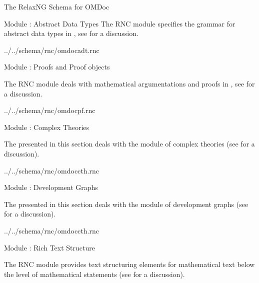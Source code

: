 \begin{tchapter}[id=rnc]{The RelaxNG Schema for OMDoc}
\begin{tsection}[id=rnc:adt]{Module {}: Abstract Data Types}
The RNC module {} specifies the grammar for abstract data types in 
{\omdoc}, see {} for a discussion.


{../../schema/rnc/omdocadt.rnc}
\end{tsection}

\begin{tsection}[id=rnc:proof]{Module {}: Proofs and Proof objects}

The RNC module {} deals with mathematical argumentations and proofs
in {\omdoc}, see {} for a discussion.


{../../schema/rnc/omdocpf.rnc}
\end{tsection}

\begin{tsection}[id=rnc:cth]{Module {}: Complex Theories}

  The {} presented in this section deals with the module
  {} of complex theories (see {} for a discussion).

 {../../schema/rnc/omdoccth.rnc}
\end{tsection}

\begin{tsection}[id=rnc:dg]{Module {}: Development Graphs}

  The {} presented in this section deals with the module
  {} of development graphs (see {} for a discussion).

 {../../schema/rnc/omdoccth.rnc}
\end{tsection}

\begin{tsection}[id=rnc:RT]{Module {}: Rich Text Structure}

  The RNC module {} provides text structuring elements for
  mathematical text below the level of mathematical statements (see
  {} for a discussion).


\end{tsection}
\end{tchapter}

